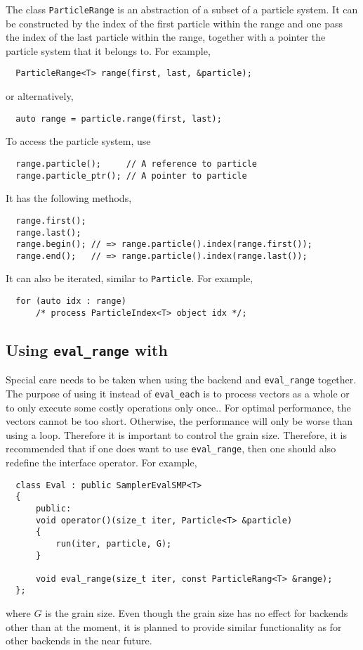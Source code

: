 The class \verb|ParticleRange| is an abstraction of a subset of a particle
system. It can be constructed by the index of the first particle within the
range and one pass the index of the last particle within the range, together
with a pointer the particle system that it belongs to. For example,
\begin{Verbatim}
  ParticleRange<T> range(first, last, &particle);
\end{Verbatim}
or alternatively,
\begin{Verbatim}
  auto range = particle.range(first, last);
\end{Verbatim}
To access the particle system, use
\begin{Verbatim}
  range.particle();     // A reference to particle
  range.particle_ptr(); // A pointer to particle
\end{Verbatim}
It has the following methods,
\begin{Verbatim}
  range.first();
  range.last();
  range.begin(); // => range.particle().index(range.first());
  range.end();   // => range.particle().index(range.last());
\end{Verbatim}
It can also be iterated, similar to \verb|Particle|. For example,
\begin{Verbatim}
  for (auto idx : range)
      /* process ParticleIndex<T> object idx */;
\end{Verbatim}

\subsection{Using \texorpdfstring{\texttt{eval\_range}}{eval\_range} with
\texorpdfstring{\tbb}{TBB}}

Special care needs to be taken when using the \tbb backend and
\verb|eval_range| together. The purpose of using it instead of \verb|eval_each|
is to process vectors as a whole or to only execute some costly operations only
once.. For optimal performance, the vectors cannot be too short. Otherwise, the
performance will only be worse than using a loop. Therefore it is important to
control the grain size. Therefore, it is recommended that if one does want to
use \verb|eval_range|, then one should also redefine the interface operator.
For example,
\begin{Verbatim}
  class Eval : public SamplerEvalSMP<T>
  {
      public:
      void operator()(size_t iter, Particle<T> &particle)
      {
          run(iter, particle, G);
      }

      void eval_range(size_t iter, const ParticleRang<T> &range);
  };
\end{Verbatim}
where $G$ is the grain size. Even though the grain size has no effect for
backends other than \tbb at the moment, it is planned to provide similar
functionality as \tbb for other backends in the near future.

